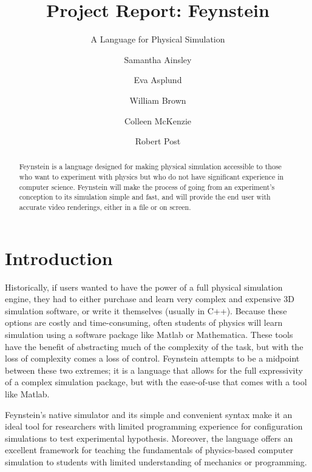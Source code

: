 
\title{Project Report: Feynstein}
\subtitle{A Language for Physical Simulation}

\author{Samantha Ainsley \and Eva Asplund \and William Brown \and
  Colleen McKenzie \and Robert Post}

\newtoggle{tutorial}
\newtoggle{manual}

\togglefalse{tutorial}
\togglefalse{manual}


\maketitle

\begin{abstract}
  Feynstein is a language designed for making physical simulation
  accessible to those who want to experiment with physics but who do not
  have significant experience in computer science. Feynstein will make
  the process of going from an experiment’s conception to its simulation
  simple and fast, and will provide the end user with accurate video
  renderings, either in a file or on screen.
\end{abstract}

\tableofcontents

\section{Introduction}

Historically, if users wanted to have the power of a full physical
simulation engine, they had to either purchase and learn very complex
and expensive 3D simulation software, or write it themselves (usually
in C++). Because these options are costly and time-consuming, often
students of physics will learn simulation using a software package
like Matlab or Mathematica. These tools have the benefit of
abstracting much of the complexity of the task, but with the loss of
complexity comes a loss of control. Feynstein attempts to be a
midpoint between these two extremes; it is a language that allows for
the full expressivity of a complex simulation package, but with the
ease-of-use that comes with a tool like Matlab.

Feynstein’s native simulator and its simple and convenient syntax make
it an ideal tool for researchers with limited programming experience
for configuration simulations to test experimental
hypothesis. Moreover, the language offers an excellent framework for
teaching the fundamentals of physics-based computer simulation to
students with limited understanding of mechanics or programming.

